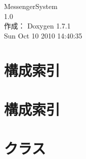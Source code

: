 \documentclass[a4paper]{book}
\begin{document}
\hypersetup{pageanchor=false}
\begin{titlepage}
\vspace*{7cm}
\begin{center}
{\Large MessengerSystem \\[1ex]\large 1.0 }\\
\vspace*{1cm}
{\large 作成： Doxygen 1.7.1}\\
\vspace*{0.5cm}
{\small Sun Oct 10 2010 14:40:35}\\
\end{center}
\end{titlepage}
\clearemptydoublepage
{}
\tableofcontents
\clearemptydoublepage
{}
\hypersetup{pageanchor=true}
\chapter{構成索引}

\chapter{構成索引}

\chapter{クラス}





\printindex
\end{document}

